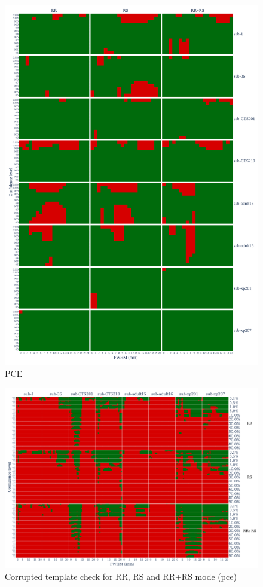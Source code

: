 \documentclass{article}
\begin{document}
\begin{appendices}
    \begin{figure}
        \centering
        \includegraphics[width=\linewidth]{figures/exclude_pce.pdf}
        \caption{PCE}
        \label{fig:loo_pce}
    \end{figure}

    \begin{figure}
        \centering
        \includegraphics[width=\linewidth]{figures/template/one_pce__template_annotated.pdf}
        \caption{Corrupted template check for RR, RS and RR+RS mode (pce)}
    \end{figure}


\end{appendices}
\end{document}
